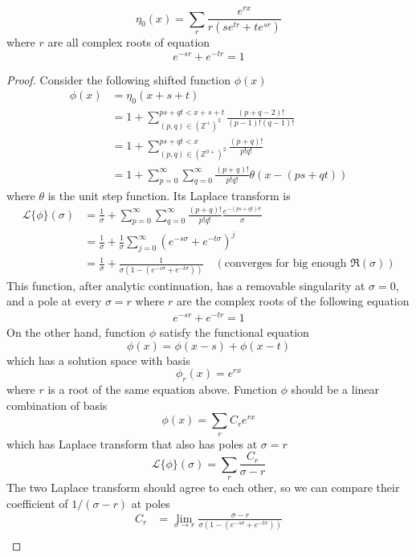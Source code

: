 \documentclass[]{article}
\begin{document}
\vspace{1cm}
\begin{lemma}
	\[
	\eta_0(x) =  \sum_r \frac{e^{rx}}{r(s e^{tr} + t e^{sr})}
	\]
	where $r$ are all complex roots of equation
	\[
	e^{-sr} + e^{-tr} = 1
	\]
\end{lemma}

\begin{proof}

Consider the following shifted function $\phi(x)$
\begin{align*}
	\phi(x) &= \eta_0(x + s +t) \\
	&= 1 + \sum_{(p,q)\in(\mathbb{Z}^+)^2}^{ps+qt < x+s+t} \frac{(p+q-2)!}{(p-1)!(q-1)!}\\
	&= 1 + \sum_{(p,q)\in(\mathbb{Z}^{0+})^2}^{ps+qt < x} \frac{(p+q)!}{p!q!}\\
	&= 1 + \sum_{p=0}^{\infty}\sum_{q=0}^{\infty} \frac{(p+q)!}{p!q!} \theta(x - (ps + qt))
\end{align*}
where $\theta$ is the unit step function. Its Laplace transform is
\begin{align*}
\mathcal{L}\{\phi\}(\sigma) &= \frac{1}{\sigma} + \sum_{p=0}^{\infty}\sum_{q=0}^{\infty} \frac{(p+q)!}{p!q!} \frac{e^{-(ps+qt)\sigma}}{\sigma} \\
&= \frac{1}{\sigma} + \frac{1}{\sigma} \sum_{j=0}^{\infty} (e^{-s\sigma} + e^{-t\sigma})^j\\
&= \frac{1}{\sigma} + \frac{1}{\sigma(1- (e^{-s\sigma} + e^{-t\sigma}))} \quad(\text{converges for big enough }\mathfrak{R}(\sigma))
\end{align*}
This function, after analytic continuation, has a removable singularity at $\sigma = 0$, and a pole at every $\sigma = r$ where $r$ are the complex roots of the following equation
\begin{align*}
e^{-sr} + e^{-tr} = 1
\end{align*}
On the other hand, function $\phi$ satisfy the functional equation
\[
\phi(x) = \phi(x - s) + \phi(x - t)
\]
which has a solution space with basis
\[
\phi_r(x) = e^{r x}
\]
where $r$ is a root of the same equation above. Function $\phi$ should be a linear combination of basis
\[
\phi(x) = \sum_{r} C_r e^{r x}
\]
which has Laplace transform that also has poles at $\sigma = r$
\[
\mathcal{L}\{\phi\}(\sigma) = \sum_{r} \frac{C_r}{\sigma - r}
\]
The two Laplace transform should agree to each other, so we can compare their coefficient of $1/(\sigma - r)$ at poles
\begin{align*}
C_r &= \lim_{\sigma\to r} \frac{\sigma - r}{\sigma(1- (e^{-s\sigma} + e^{-t\sigma}))} \\

\end{align*}
\end{proof}
\end{document}
